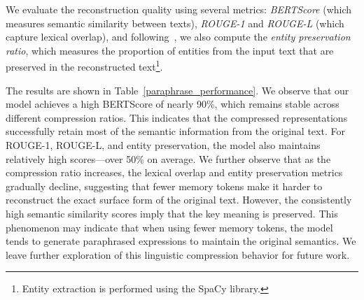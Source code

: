 \documentclass{applemlr}
\numberwithin{equation}{section}
\begin{document}
We evaluate the reconstruction quality using several metrics: \textit{BERTScore} \citep{BERTScore} (which measures semantic similarity between texts), 
\textit{ROUGE-1} and \textit{ROUGE-L} (which capture lexical overlap), 
and following~\cite{improving_information}, we also compute the \textit{entity preservation ratio}, 
which measures the proportion of entities from the input text that are preserved in the reconstructed text\footnote{Entity extraction is performed using the SpaCy library.}.

The results are shown in Table~\ref{paraphrase_performance}. 
We observe that our model achieves a high BERTScore of nearly 90\%, which remains stable across different compression ratios. 
This indicates that the compressed representations successfully retain most of the semantic information from the original text. 
For ROUGE-1, ROUGE-L, and entity preservation, the model also maintains relatively high scores—over 50\% on average. 
We further observe that as the compression ratio increases, the lexical overlap and entity preservation metrics gradually decline, 
suggesting that fewer memory tokens make it harder to reconstruct the exact surface form of the original text. 
However, the consistently high semantic similarity scores imply that the key meaning is preserved. 
This phenomenon may indicate that when using fewer memory tokens, the model tends to generate paraphrased expressions 
to maintain the original semantics. 
We leave further exploration of this linguistic compression behavior for future work.
\end{document}
